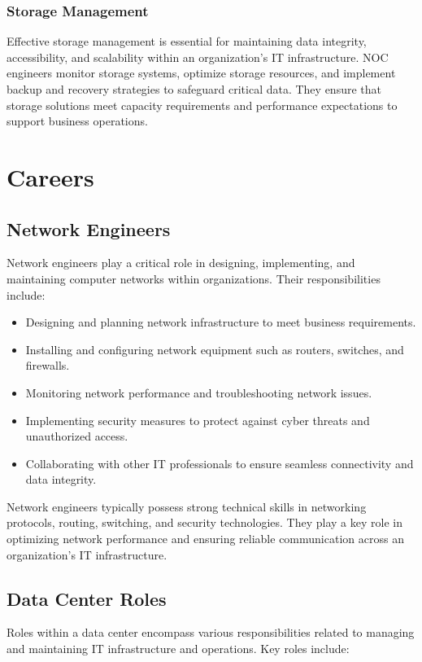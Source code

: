 \documentclass[a4paper,12pt]{report}
\begin{document}
	\subsubsection{Storage Management}
	Effective storage management is essential for maintaining data integrity, accessibility, and scalability within an organization's IT infrastructure. NOC engineers monitor storage systems, optimize storage resources, and implement backup and recovery strategies to safeguard critical data. They ensure that storage solutions meet capacity requirements and performance expectations to support business operations.
	
	\newpage

	\section{Careers}
	
	\subsection{Network Engineers}
	Network engineers play a critical role in designing, implementing, and maintaining computer networks within organizations. Their responsibilities include:
	
	\begin{itemize}
		\item Designing and planning network infrastructure to meet business requirements.
		\item Installing and configuring network equipment such as routers, switches, and firewalls.
		\item Monitoring network performance and troubleshooting network issues.
		\item Implementing security measures to protect against cyber threats and unauthorized access.
		\item Collaborating with other IT professionals to ensure seamless connectivity and data integrity.
	\end{itemize}
	
	Network engineers typically possess strong technical skills in networking protocols, routing, switching, and security technologies. They play a key role in optimizing network performance and ensuring reliable communication across an organization's IT infrastructure.
	
	\subsection{Data Center Roles}
	Roles within a data center encompass various responsibilities related to managing and maintaining IT infrastructure and operations. Key roles include:
	
\end{document}
